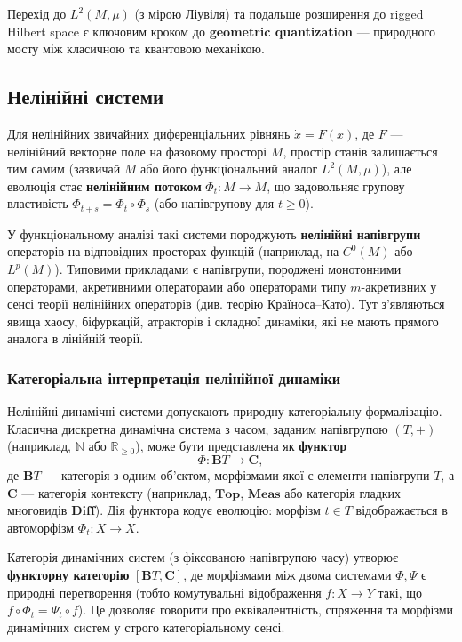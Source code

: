 \documentclass[a4paper,12pt]{article}
\begin{document}
Перехід до $L^2(M, \mu)$ (з мірою Ліувіля) та подальше розширення до rigged Hilbert space є ключовим кроком до \textbf{geometric quantization} — природного мосту між класичною та квантовою механікою.

\subsection{Нелінійні системи}

Для нелінійних звичайних диференціальних рівнянь $\dot{x} = F(x)$, де $F$ — нелінійний векторне поле на фазовому просторі $M$, простір станів залишається тим самим (зазвичай $M$ або його функціональний аналог $L^2(M,\mu)$), але еволюція стає \textbf{нелінійним потоком} $\Phi_t : M \to M$, що задовольняє групову властивість $\Phi_{t+s} = \Phi_t \circ \Phi_s$ (або напівгрупову для $t \geq 0$).

У функціональному аналізі такі системи породжують \textbf{нелінійні напівгрупи} операторів на відповідних просторах функцій (наприклад, на $C^0(M)$ або $L^p(M)$). Типовими прикладами є напівгрупи, породжені монотонними операторами, акретивними операторами або операторами типу $m$-акретивних у сенсі теорії нелінійних операторів (див. теорію Країноса–Като). Тут з’являються явища хаосу, біфуркацій, атракторів і складної динаміки, які не мають прямого аналога в лінійній теорії.

\subsubsection{Категоріальна інтерпретація нелінійної динаміки}

Нелінійні динамічні системи допускають природну категоріальну формалізацію. Класична дискретна динамічна система з часом, заданим напівгрупою $(T, +)$ (наприклад, $\mathbb{N}$ або $\mathbb{R}_{\geq 0}$), може бути представлена як \textbf{функтор} 
\[
\Phi : \mathbf{B}T \to \mathbf{C},
\]
де $\mathbf{B}T$ — категорія з одним об’єктом, морфізмами якої є елементи напівгрупи $T$, а $\mathbf{C}$ — категорія контексту (наприклад, $\mathbf{Top}$, $\mathbf{Meas}$ або категорія гладких многовидів $\mathbf{Diff}$). Дія функтора кодує еволюцію: морфізм $t \in T$ відображається в автоморфізм $\Phi_t : X \to X$.

Категорія динамічних систем (з фіксованою напівгрупою часу) утворює \textbf{функторну категорію} $[\mathbf{B}T, \mathbf{C}]$, де морфізмами між двома системами $\Phi, \Psi$ є природні перетворення (тобто комутувальні відображення $f : X \to Y$ такі, що $f \circ \Phi_t = \Psi_t \circ f$). Це дозволяє говорити про еквівалентність, спряження та морфізми динамічних систем у строго категоріальному сенсі.
\end{document}
